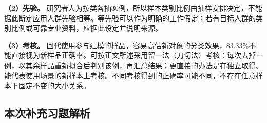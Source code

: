 \textbf{（2）先验。} 研究者人为按类各抽30例，所以样本类别比例由抽样安排决定，不能据此断定应用人群先验相等。等先验可以作为明确的工作假定；若有目标人群的类别比例或可靠专业资料，应据此设定并说明来源。

\textbf{（3）考核。} 回代使用参与建模的样品，容易高估新对象的分类效果，83.33\%不能直接视为新样品正确率。可按正文所述采用留一法（刀切法）考核：每次去掉一例，以其余样品重新拟合后判别该例，再汇总结果；更直接的办法是在独立取得、能代表使用场景的新样本上考核。不同考核得到的正确率可能不同，不存在任意样本下固定不变的大小关系。
\subsection*{本次补充习题解析}

\EndExercises
